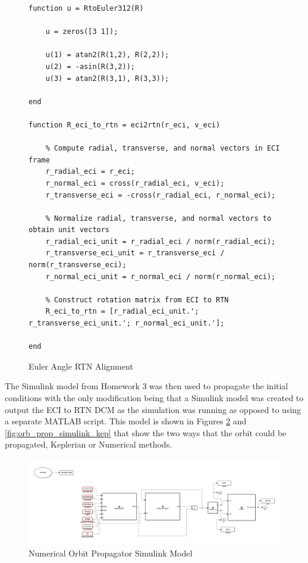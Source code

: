 \begin{figure} [H]
    \centering
    \begin{lstlisting}
function u = RtoEuler312(R)

    u = zeros([3 1]);

    u(1) = atan2(R(1,2), R(2,2));
    u(2) = -asin(R(3,2));
    u(3) = atan2(R(3,1), R(3,3));

end

function R_eci_to_rtn = eci2rtn(r_eci, v_eci)
    
    % Compute radial, transverse, and normal vectors in ECI frame
    r_radial_eci = r_eci;
    r_normal_eci = cross(r_radial_eci, v_eci);
    r_transverse_eci = -cross(r_radial_eci, r_normal_eci);
    
    % Normalize radial, transverse, and normal vectors to obtain unit vectors
    r_radial_eci_unit = r_radial_eci / norm(r_radial_eci);
    r_transverse_eci_unit = r_transverse_eci / norm(r_transverse_eci);
    r_normal_eci_unit = r_normal_eci / norm(r_normal_eci);
    
    % Construct rotation matrix from ECI to RTN
    R_eci_to_rtn = [r_radial_eci_unit.'; r_transverse_eci_unit.'; r_normal_eci_unit.'];

end
    \end{lstlisting}
    \caption{Euler Angle RTN Alignment}
    \label{fig:euler_angle_prop_model}
\end{figure}

The Simulink model from Homework 3 was then used to propagate the initial conditions with the only modification being that a Simulink model was created to output the ECI to RTN DCM as the simulation was running as opposed to using a separate MATLAB script. This model is shown in Figures \ref{fig:orb_prop_simulink_num} and \ref{fig:orb_prop_simulink_kep} that show the two ways that the orbit could be propagated, Keplerian or Numerical methods.

\begin{figure}[H]
    \centering
    \captionsetup{ justification = centering}
    \includegraphics[width = 15cm]{Images/PS4/orbital_prop_simulink_num.png}
    \caption{Numerical Orbit Propagator Simulink Model}
    \label{fig:orb_prop_simulink_num}
\end{figure}

